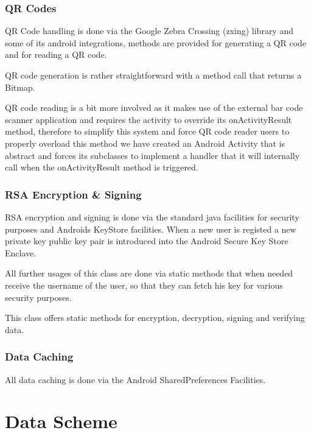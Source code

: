 \documentclass[12pt]{article}
\begin{document}
\subsubsection{QR Codes}
\hspace{0.6cm}
QR Code handling is done via the Google Zebra Crossing (zxing) library and some of its android integrations, methods are provided for generating a
QR code and for reading a QR code.

QR code generation is rather straightforward with a method call that returns a Bitmap.

QR code reading is a bit more involved as it makes use of the external bar code scanner application and requires the activity to override its onActivityResult method, therefore
to simplify this system and force QR code reader users to properly overload this method we have created an Android Activity that is abstract and forces its subclasses to
implement a handler that it will internally call when the onActivityResult method is triggered.

\subsubsection{RSA Encryption \& Signing}
\hspace{0.6cm}
RSA encryption and signing is done via the standard java facilities for security purposes and Androids KeyStore facilities. When a new user is registed a new private key public key
pair is introduced into the Android Secure Key Store Enclave.

All further usages of this class are done via static methods that when needed receive the username of the user, so that they can fetch his key for various security purposes.

This class offers static methods for encryption, decryption, signing and verifying data.

\subsubsection{Data Caching}
\hspace{0.6cm}
All data caching is done via the Android SharedPreferences Facilities.


\pagebreak
\section{Data Scheme}
\end{document}
